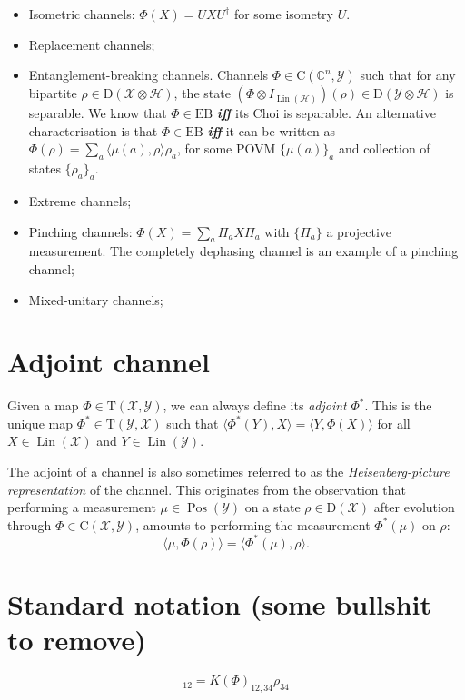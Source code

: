 \documentclass[12pt]{report}
\newcommand{\CC}{\mathbb{C}}
\newcommand{\on}[1]{\operatorname{#1}}
\newcommand{\calH}{{\mathcal{H}}}
\newcommand{\calY}{{\mathcal{Y}}}
\newcommand{\calX}{{\mathcal{X}}}
\newcommand{\rmC}{{\mathrm{C}}}
\newcommand{\rmD}{{\mathrm{D}}}
\newcommand{\rmT}{{\mathrm{T}}}
\DeclareMathOperator{\Pos}{Pos}
\DeclareMathOperator{\Lin}{Lin}
\begin{document}
\begin{itemize}
	\item Isometric channels: $\Phi(X)=UXU^\dagger$ for some isometry $U$.
	\item Replacement channels;
	\item Entanglement-breaking channels. Channels $\Phi\in\rmC(\CC^n,\calY)$ such that for any bipartite $\rho\in\rmD(\calX\otimes\calH)$, the state $(\Phi\otimes I_{\Lin(\calH)})(\rho)\in\rmD(\calY\otimes\calH)$ is separable. We know that $\Phi\in\mathrm{EB}$ \emph{\textbf{iff}} its Choi is separable.
	An alternative characterisation is that $\Phi\in\mathrm{EB}$ \emph{\textbf{iff}} it can be written as $\Phi(\rho)=\sum_a \langle \mu(a),\rho\rangle \rho_a$, for some POVM $\{\mu(a)\}_a$ and collection of states $\{\rho_a\}_a$.
	\item Extreme channels;
	\item Pinching channels: $\Phi(X) =\sum_a \Pi_a X\Pi_a$ with $\{\Pi_a\}$ a projective measurement. The completely dephasing channel is an example of a pinching channel;
	\item Mixed-unitary channels;
\end{itemize}

\section{Adjoint channel}

Given a map $\Phi\in\rmT(\calX,\calY)$, we can always define its \emph{adjoint} $\Phi^*$. This is the unique map $\Phi^*\in\rmT(\calY,\calX)$ such that $\langle \Phi^*(Y),X\rangle=\langle Y,\Phi(X)\rangle$ for all $X\in\Lin(\calX)$ and $Y\in\Lin(\calY)$.

The adjoint of a channel is also sometimes referred to as the \emph{Heisenberg-picture representation} of the channel. This originates from the observation that performing a measurement $\mu\in\Pos(\calY)$ on a state $\rho\in\rmD(\calX)$ after evolution through $\Phi\in\rmC(\calX,\calY)$, amounts to performing the measurement $\Phi^*(\mu)$ on $\rho$:
\begin{equation}
	\langle \mu,\Phi(\rho) \rangle = \langle \Phi^*(\mu),\rho\rangle.
\end{equation}

\section{Standard notation (some bullshit to remove)}

\begin{equation}
	[K(\Phi)\on{vec}(\rho)]_{12} = K(\Phi)_{12,34}\rho_{34}
\end{equation}
\end{document}
